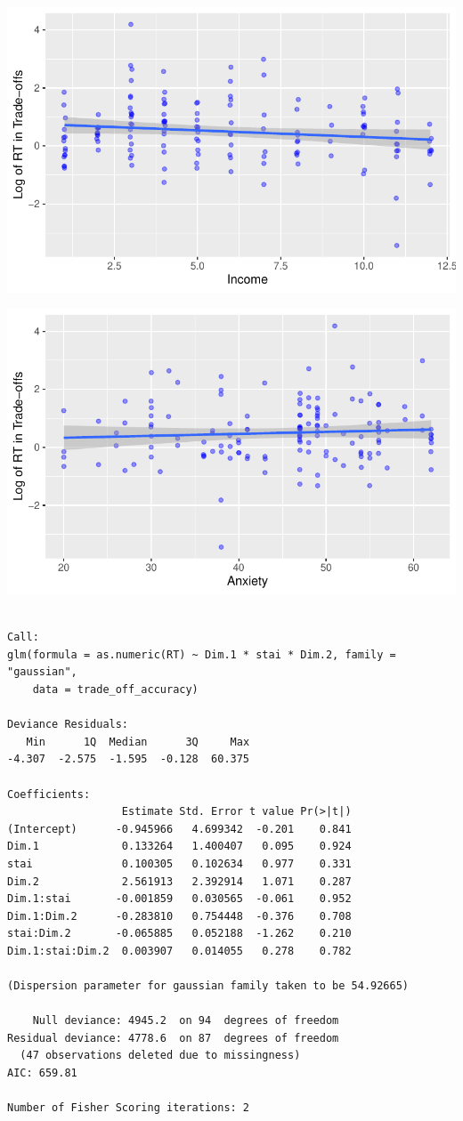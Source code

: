 \includegraphics{thesis-file-ppq_files/figure-latex/unnamed-chunk-16-3.pdf}

\includegraphics{thesis-file-ppq_files/figure-latex/unnamed-chunk-16-4.pdf}

\begin{verbatim}

Call:
glm(formula = as.numeric(RT) ~ Dim.1 * stai * Dim.2, family = "gaussian", 
    data = trade_off_accuracy)

Deviance Residuals: 
   Min      1Q  Median      3Q     Max  
-4.307  -2.575  -1.595  -0.128  60.375  

Coefficients:
                  Estimate Std. Error t value Pr(>|t|)
(Intercept)      -0.945966   4.699342  -0.201    0.841
Dim.1             0.133264   1.400407   0.095    0.924
stai              0.100305   0.102634   0.977    0.331
Dim.2             2.561913   2.392914   1.071    0.287
Dim.1:stai       -0.001859   0.030565  -0.061    0.952
Dim.1:Dim.2      -0.283810   0.754448  -0.376    0.708
stai:Dim.2       -0.065885   0.052188  -1.262    0.210
Dim.1:stai:Dim.2  0.003907   0.014055   0.278    0.782

(Dispersion parameter for gaussian family taken to be 54.92665)

    Null deviance: 4945.2  on 94  degrees of freedom
Residual deviance: 4778.6  on 87  degrees of freedom
  (47 observations deleted due to missingness)
AIC: 659.81

Number of Fisher Scoring iterations: 2
\end{verbatim}

